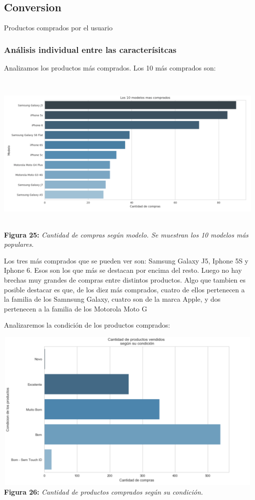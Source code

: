 \documentclass[titlepage,a4paper]{article}
\begin{document}
	\subsection{Conversion}
	Productos comprados por el usuario
	\subsubsection{Análisis individual entre las caracterísitcas}
	Analizamos los productos más comprados. Los 10 más comprados son:
	\begin{center}
	\includegraphics[width=15cm,height = 8cm]{productosMasComprados.jpg}\\
	\textbf{Figura 25:}  \textit{ Cantidad de compras según modelo. Se muestran los 10 modelos más populares. }
	\end{center}
	
	Los tres más comprados que se pueden ver son: Samsung Galaxy J5, Iphone 5S y Iphone
6. Esos son los que más se destacan por encima del resto. Luego no hay brechas muy grandes de
compras entre distintos productos. Algo que tambien es posible destacar es que, de los diez más
comprados, cuatro de ellos pertenecen a la familia de los Samnsung Galaxy, cuatro son de la marca
Apple, y dos pertenecen a la familia de los Motorola Moto G

	Analizaremos la condición de los productos comprados: 
	\begin{center}
	\includegraphics[width=15cm,height = 8cm]{cantidadDeProductosVendidosSegunSuCondicion.jpg}\\
	\textbf{Figura 26:}  \textit{Cantidad de productos comprados según su condición. }
	\end{center}
	
\end{document}
